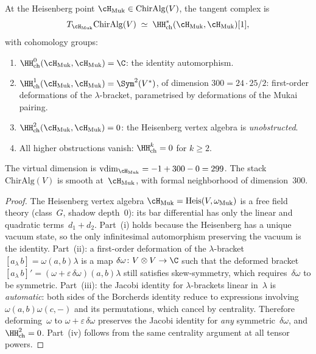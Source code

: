 \begin{proposition}
\label{prop:tangent-chiralg}
At the Heisenberg point $\cH_{\mathrm{Muk}} \in \mathrm{ChirAlg}(V)$, the tangent complex is
\[
 T_{\cH_{\mathrm{Muk}}} \mathrm{ChirAlg}(V) \;\simeq\; \HH^*_{\mathrm{ch}}(\cH_{\mathrm{Muk}}, \cH_{\mathrm{Muk}})[1],
\]
with cohomology groups:
\begin{enumerate}[label=\textup{(\roman*)}]
 \item $\HH^0_{\mathrm{ch}}(\cH_{\mathrm{Muk}}, \cH_{\mathrm{Muk}}) = \C$: the identity automorphism.
 \item $\HH^1_{\mathrm{ch}}(\cH_{\mathrm{Muk}}, \cH_{\mathrm{Muk}}) = \Sym^2(V^*)$, of dimension $300 = 24 \cdot 25/2$: first-order deformations of the $\lambda$-bracket, parametrised by deformations of the Mukai pairing.
 \item $\HH^2_{\mathrm{ch}}(\cH_{\mathrm{Muk}}, \cH_{\mathrm{Muk}}) = 0$: the Heisenberg vertex algebra is \emph{unobstructed}.
 \item All higher obstructions vanish: $\HH^k_{\mathrm{ch}} = 0$ for $k \geq 2$.
\end{enumerate}
The virtual dimension is $\mathrm{vdim}_{\cH_{\mathrm{Muk}}} = -1 + 300 - 0 = 299$. The stack $\mathrm{ChirAlg}(V)$ is smooth at~$\cH_{\mathrm{Muk}}$, with formal neighborhood of dimension~$300$.
\end{proposition}

\begin{proof}
The Heisenberg vertex algebra $\cH_{\mathrm{Muk}} = \mathrm{Heis}(V, \omega_{\mathrm{Muk}})$ is a free field theory (class~$G$, shadow depth~$0$): its bar differential has only the linear and quadratic terms~$d_1 + d_2$. Part~(i) holds because the Heisenberg has a unique vacuum state, so the only infinitesimal automorphism preserving the vacuum is the identity. Part~(ii): a first-order deformation of the $\lambda$-bracket $[a_\lambda\, b] = \omega(a, b)\lambda$ is a map $\delta\omega \colon V \otimes V \to \C$ such that the deformed bracket $[a_\lambda\, b]' = (\omega + \varepsilon\,\delta\omega)(a, b)\lambda$ still satisfies skew-symmetry, which requires~$\delta\omega$ to be symmetric. Part~(iii): the Jacobi identity for $\lambda$-brackets linear in~$\lambda$ is \emph{automatic}: both sides of the Borcherds identity reduce to expressions involving $\omega(a,b)\omega(c,-)$ and its permutations, which cancel by centrality. Therefore deforming~$\omega$ to $\omega + \varepsilon\,\delta\omega$ preserves the Jacobi identity for \emph{any} symmetric~$\delta\omega$, and $\HH^2_{\mathrm{ch}} = 0$. Part~(iv) follows from the same centrality argument at all tensor powers.
\end{proof}

